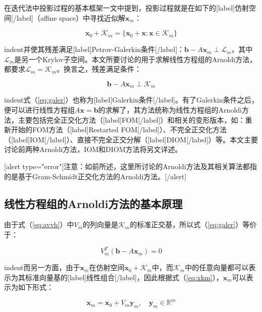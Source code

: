 \documentclass[UTF8,nofonts]{ctexart}
\begin{document}
在迭代法中投影过程的基本框架一文中提到，投影过程就是在如下的[label]仿射空间[/label]（affine space）中寻找近似解$\boldsymbol{x}_m$：

\begin{equation}
\label{eq:xkm}
\boldsymbol{x}_0+\mathcal{K}_m=\{\boldsymbol{x}_0+\boldsymbol{x}:\boldsymbol{x}\in\mathcal{K}_m\}
\end{equation}

indent并使其残差满足[label]Petrov-Galerkin条件[/label]：$\boldsymbol{b}-A\boldsymbol{x}_m\perp\mathcal{L}_m$，其中$\mathcal{L}_m$是另一个Krylov子空间。本文所要讨论的用于求解线性方程组的Arnoldi方法，都要求$\mathcal{L}_m=\mathcal{K}_m$。换言之，残差满足条件：

\begin{equation}
\label{eq:galer}
\boldsymbol{b}-A\boldsymbol{x}_m\perp\mathcal{K}_m
\end{equation}

indent式（\ref{eq:galer}）也称为[label]Galerkin条件[/label]。有了Galerkin条件之后，便可以进行线性方程组$A\boldsymbol{x}=\boldsymbol{b}$的求解了，其方法统称为线性方程组的Arnoldi方法，主要包括完全正交化方法（[label]FOM[/label]）和相关的变形版本，如：重新开始的FOM方法（[label]Restarted FOM[/label]）、不完全正交化方法（[label]IOM[/label]）、直接不完全正交分解（[label]DIOM[/label]）等。本文主要讨论前两种Arnoldi方法，IOM和DIOM方法将另文详述。

[alert type="error"]注意：如前所述，这里所讨论的Arnoldi方法及其相关算法都指的是基于Gram-Schmidt正交化方法的Arnoldi方法。[/alert]

\subsection*{线性方程组的Arnoldi方法的基本原理}

由于式（\ref{eq:avvh}）中$V_m$的列向量是$\mathcal{K}_m$的标准正交基，所以式（\ref{eq:galer}）等价于：

\begin{equation}
\label{eq:vtkm}
V_m^T(\boldsymbol{b}-A\boldsymbol{x}_m)=0
\end{equation}

indent而另一方面，由于$\boldsymbol{x}_m$在仿射空间$\boldsymbol{x}_0+\mathcal{K}_m$中，而$\mathcal{K}_m$中的任意向量都可以表示为其标准向量基的[label]线性组合[/label]，因此根据式（\ref{eq:xkm}），$\boldsymbol{x}_m$可以表示为如下形式：

\begin{equation}
\label{eq:xvy}
\boldsymbol{x}_m=\boldsymbol{x}_0+V_m\boldsymbol{y}_m,\quad\boldsymbol{y}_m\in\mathbb{R}^m
\end{equation}
\end{document}
